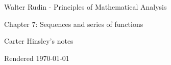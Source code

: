 \documentclass[a4paper]{article}
\begin{document}
\begin{center}
\LARGE{Walter Rudin - Principles of Mathematical Analysis}

\Large{Chapter 7: Sequences and series of functions}

\large{Carter Hinsley's notes}

Rendered \today
\end{center}
\end{document}
